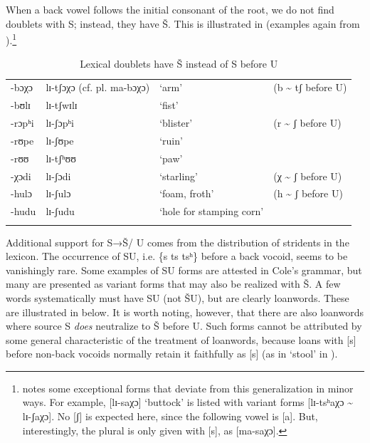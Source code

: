 \documentclass[output=paper,newtxmath,modfonts,nonflat,hidelinks]{langsci/langscibook}
\begin{document}
\newpage 
When a back vowel follows the initial consonant of the root, we do not find doublets with S; instead, they have Š. This is illustrated in  (examples again from \citealt{Cole1955}).\footnote{\citet[83]{Cole1955} notes some exceptional forms that deviate from this generalization in minor ways. For example, [lɪ-saχɔ] ‘buttock’ is listed with variant forms [lɪ-tsʰaχɔ {\textasciitilde} lɪ-ʃaχɔ]. No [ʃ] is expected here, since the following vowel is [a]. But, interestingly, the plural is only given with [s], as [ma-saχɔ].}

\begin{table}[t]
\begin{tabularx}{\textwidth}{lllX}
\lsptoprule

-bɔχɔ & lɪ-tʃɔχɔ
(cf. pl. ma-bɔχɔ) & ‘arm’ & (b {\textasciitilde} tʃ before U)\\
-bʊlɪ & lɪ-tʃwɪlɪ & ‘fist’ & \\
-rɔpʰi & lɪ-ʃɔpʰi & ‘blister’ & (r {\textasciitilde} ʃ before U)\\
-rʊpe & lɪ-ʃʊpe & ‘ruin’ & \\
-rʊʊ & lɪ-tʃʰʊʊ & ‘paw’ & \\
-χɔdi & lɪ-ʃɔdi & ‘starling’ & (χ {\textasciitilde} ʃ before U)\\
-hulɔ & lɪ-ʃulɔ & ‘foam, froth’ & (h {\textasciitilde} ʃ before U)\\
-hudu & lɪ-ʃudu & ‘hole for stamping corn’ & \\
\lspbottomrule
\end{tabularx}
\caption{Lexical doublets have Š instead of S before U}
\label{tab:bennett:5}
\end{table}

Additional support for S→Š/ {\longrule} U comes from the distribution of stridents in the lexicon. The occurrence of SU, i.e. \{s ts tsʰ\} before a back vocoid, seems to be vanishingly rare. Some examples of SU forms are attested in Cole’s grammar, but many are presented as variant forms that may also be realized with Š. A few words systematically must have SU (not ŠU), but are clearly loanwords. These are illustrated in  below. It is worth noting, however, that there are also loanwords where source S \textit{does} neutralize to Š before U. Such forms cannot be attributed by some general characteristic of the treatment of loanwords, because loans with [s] before non-back vocoids normally retain it faithfully as [s] (as in ‘stool’ in ).
\end{document}
